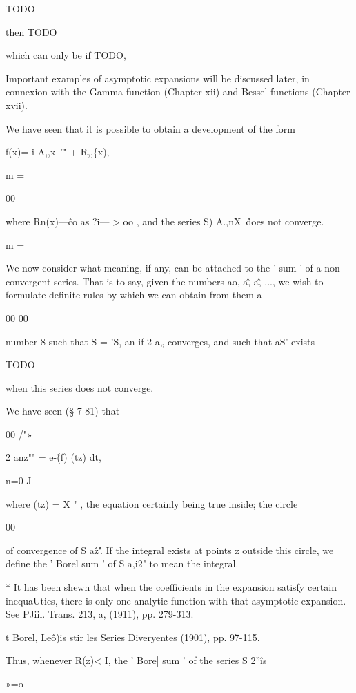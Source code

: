 TODO

then TODO

which can only be if TODO,

Important examples of asymptotic expansions will be discussed later,
in connexion with the Gamma-function (Chapter xii) and Bessel
functions (Chapter xvii).


We have seen that it is possible to obtain a development of the form

f(x)= i A,,x~'" + R,,\{x),

m =

00

where Rn(x)—\^ co as ?i— > oo , and the series S) A.,nX~\^ does not
converge.

m =

We now consider what meaning, if any, can be attached to the ' sum '
of a non- convergent series. That is to say, given the numbers ao,
a\^, a\^, ..., we wish to formulate definite rules by which we can
obtain from them a

00 00

number 8 such that S = 'S, an if 2 a„ converges, and such that aS'
exists

TODO

when this series does not converge.

 We have seen (§ 7-81) that

00 /"»

2 anz"" = e-\^(f) (tz) dt,

n=0 J

where (tz) = X " , the equation certainly being true inside; the
circle

00

of convergence of S a\^z'\^. If the integral exists at points z
outside this circle, we define the ' Borel sum ' of S a,i2" to mean
the integral.

* It has been shewn that when the coefficients in the expansion
satisfy certain inequaUties, there is only one analytic function with
that asymptotic expansion. See PJiil. Trans. 213, a, (1911), pp.
279-313.

t Borel, Le\^o)is stir les Series Diveryentes (1901), pp. 97-115.

% 
% 

Thus, whenever R(z)< I, the ' Bore] sum ' of the series S 2''\^ is

»=o

